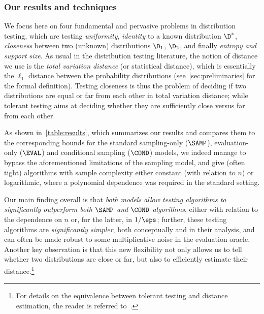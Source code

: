       \subsubsection{Our results and techniques}
  We focus here on four fundamental and pervasive problems in distribution testing, which are testing \emph{uniformity}, \emph{identity} to a known distribution $\D^\ast$, \emph{closeness} between two (unknown) distributions $\D_1$, $\D_2$, and finally \emph{entropy and support size}. As usual in the distribution testing literature, the notion of distance we use is the \emph{total variation distance} (or statistical distance), which is essentially the $\ell_1$ distance between the probability distributions (see~\cref{sec:preliminaries} for the formal definition). Testing closeness is thus the problem of deciding if two distributions are equal or far from each other in total variation distance; while tolerant testing aims at deciding whether they are sufficiently close versus far from each other.
    
  As shown in~\cref{table:results}, which summarizes our results and compares them to the corresponding bounds for the standard sampling-only ($\SAMP$), evaluation-only ($\EVAL$) and conditional sampling ($\COND$) models, we indeed manage to bypass the aforementioned limitations of the sampling model, and give (often tight) algorithms with sample complexity either constant (with relation to $n$) or logarithmic, where a polynomial dependence was required in the standard setting.
  
  Our main finding overall is that \emph{both \pdfsamp models allow testing algorithms to significantly outperform both $\SAMP$ and $\COND$ algorithms}, either with relation to the dependence on $n$ or, for the latter, in $1/\eps$; further, these testing algorithms are \emph{significantly simpler}, both conceptually and in their analysis, and can often be made robust to some multiplicative noise in the evaluation oracle. Another key observation is that this new flexibility not only allows us to tell whether two distributions are close or far, but also to efficiently estimate their distance.\footnote{For details on the equivalence between tolerant testing and distance estimation, the reader is referred to~\cite{PRR:2006}.}
  
